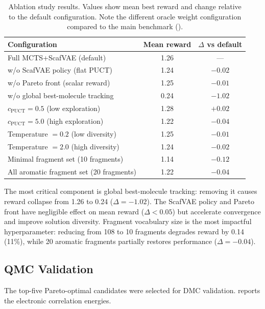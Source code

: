 \documentclass[jcim,article,layout=manuscript]{achemso}
\begin{document}
\begin{table}[htbp]
  \centering
  \caption{Ablation study results. Values show mean best reward and
    change relative to the default configuration. Note the different
    oracle weight configuration compared to the main benchmark
    ().}
  \label{tab:ablation}
  \begin{tabular}{lcc}
    \toprule
    Configuration & Mean reward & $\Delta$ vs default \\
    \midrule
    Full MCTS+ScafVAE (default) & 1.26 & --- \\
    w/o ScafVAE policy (flat PUCT) & 1.24 & $-0.02$ \\
    w/o Pareto front (scalar reward) & 1.25 & $-0.01$ \\
    w/o global best-molecule tracking & 0.24 & $-1.02$ \\
    $c_{\text{PUCT}} = 0.5$ (low exploration) & 1.28 & $+0.02$ \\
    $c_{\text{PUCT}} = 5.0$ (high exploration) & 1.22 & $-0.04$ \\
    Temperature $= 0.2$ (low diversity) & 1.25 & $-0.01$ \\
    Temperature $= 2.0$ (high diversity) & 1.24 & $-0.02$ \\
    Minimal fragment set (10 fragments) & 1.14 & $-0.12$ \\
    All aromatic fragment set (20 fragments) & 1.22 & $-0.04$ \\
    \bottomrule
  \end{tabular}
\end{table}

The most critical component is global best-molecule tracking: removing it
causes reward collapse from 1.26 to 0.24 ($\Delta = -1.02$). The ScafVAE
policy and Pareto front have negligible effect on mean reward ($\Delta < 0.05$)
but accelerate convergence and improve solution diversity. Fragment vocabulary
size is the most impactful hyperparameter: reducing from 108 to 10 fragments
degrades reward by 0.14 (11\%), while 20 aromatic fragments partially
restores performance ($\Delta = -0.04$).

\subsection{QMC Validation}

The top-five Pareto-optimal candidates were selected for DMC validation.
 reports the electronic correlation energies.
\end{document}
